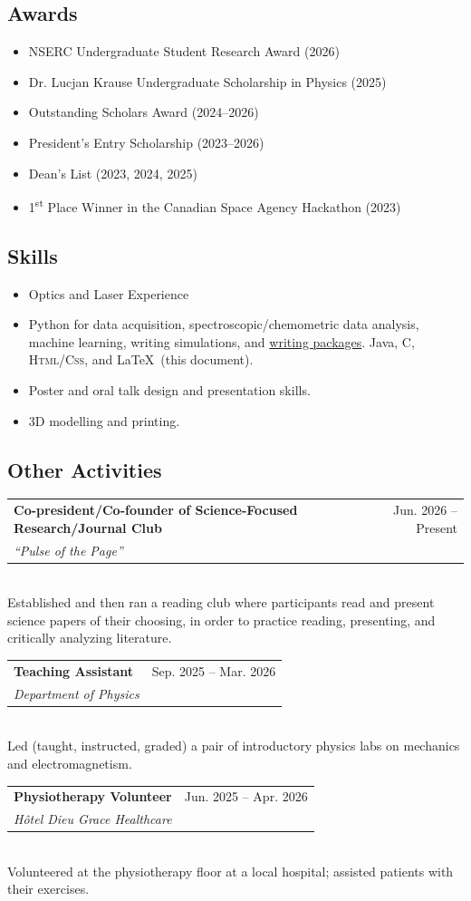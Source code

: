 \documentclass[11pt]{article}
\makeatletter
\newcommand{\activity}[3]{
	\begin{tabular*}{\textwidth}{l@{\extracolsep{\fill}}r}
		\textbf{#1} & #3 \\
		\textit{#2} & \\
\end{tabular*} \\}
\makeatother
\begin{document}
\subsection*{Awards}
\begin{itemize}
	\item NSERC Undergraduate Student Research Award (2026)
	\item Dr. Lucjan Krause Undergraduate Scholarship in Physics (2025)
	\item Outstanding Scholars Award (2024--2026)
	\item President's Entry Scholarship (2023--2026)
	\item Dean's List (2023, 2024, 2025)
	\item 1\textsuperscript{st} Place Winner in the Canadian Space Agency Hackathon (2023)
\end{itemize}

\subsection*{Skills}
\begin{itemize}
	\item Optics and Laser Experience
	\item Python for data acquisition, spectroscopic/chemometric data analysis, machine learning, writing simulations, and \href{https://aumustafa.github.io/plots-gallery/}{writing packages}. Java, C, \textsc{Html/Css}, and \LaTeX\ (this document).
	\item Poster and oral talk design and presentation skills.
	\item 3D modelling and printing.
\end{itemize}

\subsection*{Other Activities}

\activity{Co-president/Co-founder of Science-Focused Research/Journal Club}{``Pulse of the Page''}{Jun. 2026 -- Present}
Established and then ran a reading club where participants read and present science papers of their choosing, in order to practice reading, presenting, and critically analyzing literature.

\activity{Teaching Assistant}{Department of Physics}{Sep. 2025 -- Mar. 2026}
Led (taught, instructed, graded) a pair of introductory physics labs on mechanics and electromagnetism.

\activity{Physiotherapy Volunteer}{H\^otel Dieu Grace Healthcare}{Jun. 2025 -- Apr. 2026}
Volunteered at the physiotherapy floor at a local hospital; assisted patients with their exercises.
\end{document}
